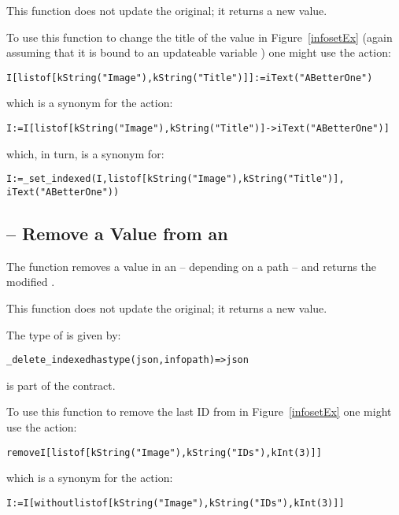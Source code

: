 \begin{aside}
This function does not update the original; it returns a new value.
\end{aside}

To use this function to change the title of the value in Figure~\vref{infosetEx} (again assuming that it is bound to an updateable variable ) one might use the action:
\begin{alltt}
I[list of [kString("Image"), kString("Title")]] := iText("A Better One")
\end{alltt}
which is a synonym for the action:
\begin{alltt}
I := I[list of [kString("Image"), kString("Title")]->iText("A Better One")]
\end{alltt}
which, in turn, is a synonym for:
\begin{alltt}
I := \_set_indexed(I,list of [kString("Image"),kString("Title")],
                  iText("A Better One"))
\end{alltt}

\subsection{ -- Remove a Value from an }

The  function removes a value in an  -- depending on a path -- and returns the modified .
\begin{aside}
This function does not update the original; it returns a new value.
\end{aside}
The type of  is given by:
\begin{alltt}
\_delete\_indexed has type (json,info path)=>json
\end{alltt}
 is part of the  contract.

To use this function to remove the last ID from  in Figure~\vref{infosetEx} one might use the action:
\begin{alltt}
remove I[list of [kString("Image"), kString("IDs"), kInt(3)]]
\end{alltt}
which is a synonym for the action:
\begin{alltt}
I := I[without list of [kString("Image"),kString("IDs"), kInt(3)]]
\end{alltt}

